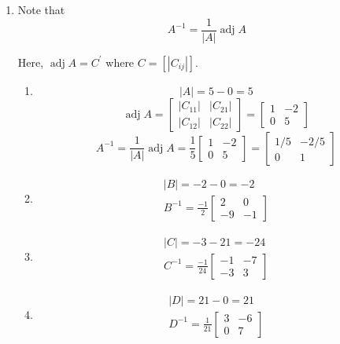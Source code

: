 \begin{enumerate}

\item[2.] Note that \[
A^{-1}=\frac{1}{|A|} \operatorname{adj} A
\]

Here, \( \operatorname{adj} A=C^{\prime} \) where \( C=\left[\left|C_{i j}\right|\right] \).

\begin{enumerate}

\item 
\[ |A|=5-0=5 \]
\[\operatorname{adj} A=\left[\begin{array}{ll}\left|C_{11}\right| & \left|C_{21}\right| \\ \left|C_{12}\right| & \left|C_{22}\right|\end{array}\right]=\left[\begin{array}{cc}1 & -2 \\ 0 & 5\end{array}\right] \]
\[A^{-1}=\frac{1}{|A|} \operatorname{adj} A=\frac{1}{5}\left[\begin{array}{cc}1 & -2 \\ 0 & 5\end{array}\right]=\left[\begin{array}{cc}1 / 5 & -2 / 5 \\ 0 & 1\end{array}\right] \]

\item \[
\begin{array}{l}
|B|=-2-0=-2 \\
B^{-1}=\frac{-1}{2}\left[\begin{array}{rr}
2 & 0 \\
-9 & -1
\end{array}\right]
\end{array} 
\]

\item \[
\begin{array}{l}
|C|=-3-21=-24 \\
C^{-1}=\frac{-1}{24}\left[\begin{array}{cc}
-1 & -7 \\
-3 & 3
\end{array}\right]
\end{array}
\]

\item \[
\begin{array}{l}
|D|=21-0=21 \\
D^{-1}=\frac{1}{21}\left[\begin{array}{rr}
3 & -6 \\
0 & 7
\end{array}\right]
\end{array}
\]
\end{enumerate}


\end{enumerate}
